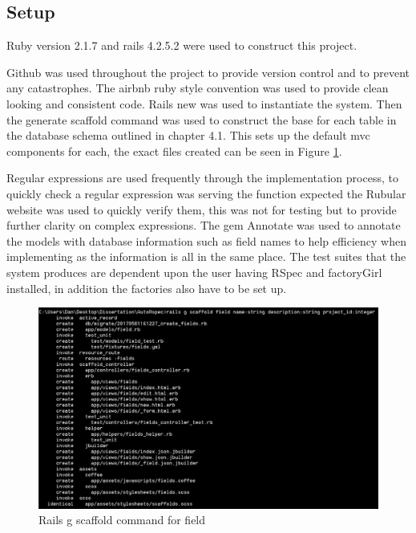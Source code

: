 \documentclass[a4paper,12pt]{article}
\begin{document}
\subsection{Setup}
\par Ruby version 2.1.7 and rails 4.2.5.2 were used to construct this project.
\vspace{3mm}
\par Github\cite{github} was used throughout the project to provide version control and to prevent any catastrophes. The airbnb ruby style convention was used to provide clean looking and consistent code\cite{Airbnb}. Rails new was used to instantiate the system. Then the generate scaffold command was used to construct the base for each table in the database schema outlined in chapter 4.1. This sets up the default mvc components for each, the exact files created can be seen in Figure \ref{fig:scaffold}. 
\vspace{3mm}
\par Regular expressions are used frequently through the implementation process, to quickly check a regular expression was serving the function expected the Rubular\cite{rubular} website was used to quickly verify them, this was not for testing but to provide further clarity on complex expressions. The gem Annotate\cite{annotate} was used to annotate the models with database information such as field names to help efficiency when implementing as the information is all in the same place. The test suites that the system produces are dependent upon the user having RSpec and factoryGirl installed, in addition the factories also have to be set up.

\begin{figure}
\includegraphics[width=\linewidth]{screenshots/scaffold_example}
\caption{Rails g scaffold command for field}
\label{fig:scaffold}
\end{figure}
\end{document}
